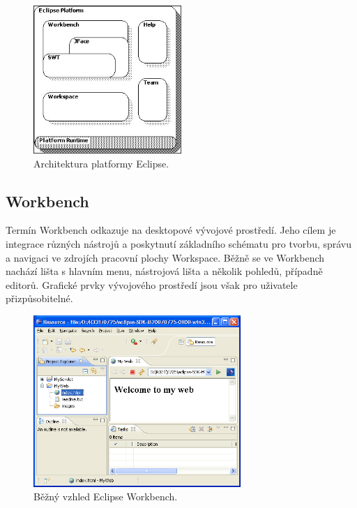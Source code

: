   \begin{figure}[h]
    \includegraphics[width=0.5\textwidth, center]{obrazky-figures/eclipse_arch.jpg}
    \caption{Architektura platformy Eclipse.}
    \label{fig:eclipse_arch}
  \end{figure}

    \subsection{Workbench}
    Termín Workbench odkazuje na desktopové vývojové prostředí. Jeho cílem je integrace různých nástrojů a poskytnutí základního schématu pro tvorbu, správu a navigaci ve zdrojích pracovní plochy Workspace. Běžně se ve Workbench nachází lišta s hlavním menu, nástrojová lišta a několik pohledů, případně editorů. Grafické prvky vývojového prostředí jsou však pro uživatele přizpůsobitelné.

    \begin{figure}[h]
      \includegraphics[width=0.7\textwidth, center]{obrazky-figures/eclipse_workbench.png}
      \caption{Běžný vzhled Eclipse Workbench.}
      \label{fig:eclipse_workbench}
    \end{figure}

